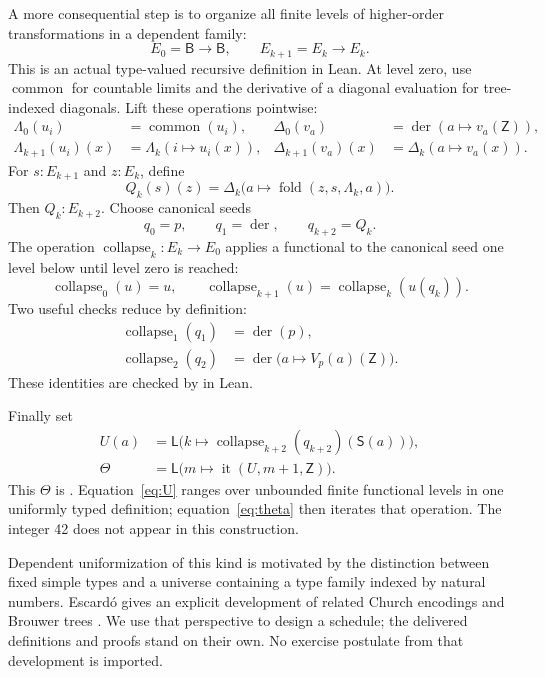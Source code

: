 \documentclass[11pt,a4paper]{article}
\theoremstyle{definition}
\newcommand{\B}{\mathsf B}
\newcommand{\iter}{\operatorname{it}}
\newcommand{\code}[1]{\texttt{\detokenize{#1}}}
\DeclareMathOperator{\der}{der}
\begin{document}
A more consequential step is to organize all finite levels of higher-order
transformations in a dependent family:
\[
 E_0=\B\to\B,\qquad E_{k+1}=E_k\to E_k.
\]
This is an actual type-valued recursive definition in Lean. At level zero,
use \(\operatorname{common}\) for countable limits and the derivative of a
diagonal evaluation for tree-indexed diagonals. Lift these operations
pointwise:
\begin{align*}
 \Lambda_0(u_i)&=\operatorname{common}(u_i),&
 \Delta_0(v_a)&=\der(a\mapsto v_a(\mathsf Z)),\\
 \Lambda_{k+1}(u_i)(x)&=\Lambda_k(i\mapsto u_i(x)),&
 \Delta_{k+1}(v_a)(x)&=\Delta_k(a\mapsto v_a(x)).
\end{align*}
For \(s:E_{k+1}\) and \(z:E_k\), define
\[
 Q_k(s)(z)=
       \Delta_k\bigl(a\mapsto\operatorname{fold}(z,s,\Lambda_k,a)\bigr).
\]
Then \(Q_k:E_{k+2}\). Choose canonical seeds
\[
 q_0=p,\qquad q_1=\der,\qquad q_{k+2}=Q_k.
\]
The operation \(\operatorname{collapse}_k:E_k\to E_0\) applies a functional
to the canonical seed one level below until level zero is reached:
\[
 \operatorname{collapse}_0(u)=u,\qquad
 \operatorname{collapse}_{k+1}(u)
      =\operatorname{collapse}_k(u(q_k)).
\]
Two useful checks reduce by definition:
\begin{align*}
 \operatorname{collapse}_1(q_1)&=\der(p),\\
 \operatorname{collapse}_2(q_2)
   &=\der\bigl(a\mapsto V_p(a)(\mathsf Z)\bigr).
\end{align*}
These identities are checked by \code{rfl} in Lean.

Finally set
\begin{align}
 U(a)&=\mathsf L\bigl(k\mapsto
   \operatorname{collapse}_{k+2}(q_{k+2})(\mathsf S(a))\bigr),\label{eq:U}\\
 \Theta&=\mathsf L\bigl(m\mapsto\iter(U,m+1,\mathsf Z)\bigr).
 \label{eq:theta}
\end{align}
This \(\Theta\) is \code{treeIndex}. Equation~\eqref{eq:U} ranges over
unbounded finite functional levels in one uniformly typed definition;
equation~\eqref{eq:theta} then iterates that operation. The integer 42 does
not appear in this construction.

Dependent uniformization of this kind is motivated by the distinction
between fixed simple types and a universe containing a type family indexed
by natural numbers. Escard\'o gives an explicit development of related
Church encodings and Brouwer trees \cite{escardo}. We use that perspective
to design a schedule; the delivered definitions and proofs stand on their
own. No exercise postulate from that development is imported.
\end{document}
